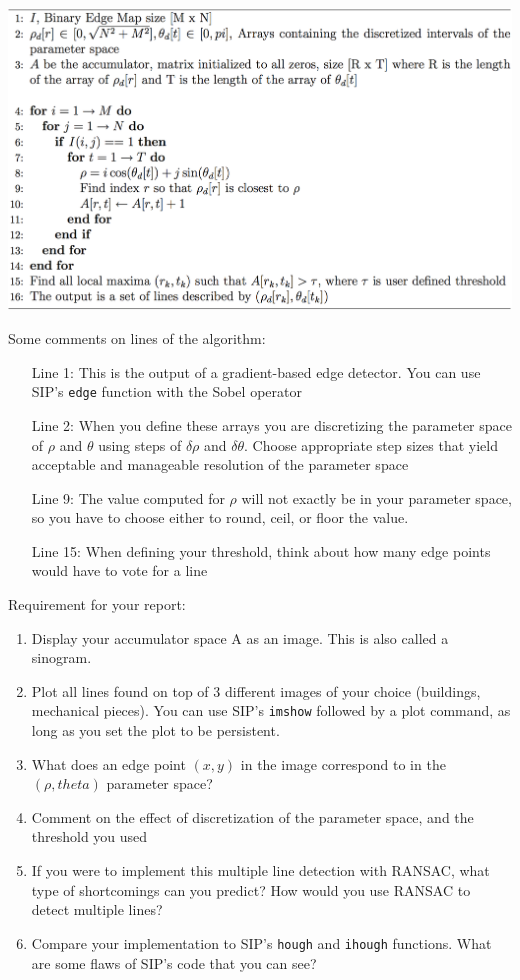 \documentclass[a4paper]{article}
\begin{document}
\includegraphics[width=1\linewidth]{figs/alg-hough-lines.png}%

Some comments on lines of the algorithm:
\begin{itemize}
\item[Line 1:] This is the output of a gradient-based edge
detector. You can use SIP's \texttt{edge} function with the Sobel operator
\item[Line 2:] When you define these arrays you are discretizing the parameter
space of $\rho$ and $\theta$ using steps of $\delta \rho$ and $\delta
\theta$. Choose appropriate step sizes that yield acceptable and manageable
resolution of the parameter space
\item[Line 9:] The value computed for $\rho$ will not exactly be in your
parameter space, so you have to choose either to round, ceil, or floor the value.
\item[Line 15:] When defining your threshold, think about how many edge points would
have to vote for a line
\end{itemize}
Requirement for your report:
\begin{enumerate}
\item Display your accumulator space A as an image. This is also called a
sinogram.
\item Plot all lines found on top of 3 different images of your choice
(buildings, mechanical pieces). You can use SIP's \texttt{imshow} followed by a
plot command, as long as you set the plot to be persistent.
\item What does an edge point $(x,y)$ in the image correspond to in the $(\rho,
theta)$ parameter space?
\item Comment on the effect of discretization of the parameter space, and the
threshold you used
\item If you were to implement this multiple line detection with RANSAC, what type of shortcomings can
you predict? How would you use RANSAC to detect multiple lines?
\item Compare your implementation to SIP's \texttt{hough} and \texttt{ihough}
functions. What are some flaws of SIP's code that you can see?
\end{enumerate}
\end{document}
